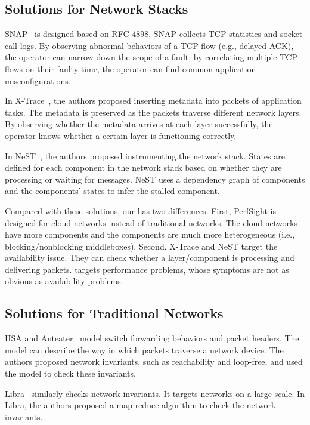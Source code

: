 \subsection{Solutions for Network Stacks}
SNAP~\cite{snap} is designed based on RFC 4898. SNAP collects TCP statistics and socket-call logs.
By observing abnormal behaviors of a TCP flow (e.g., delayed ACK), the operator
can narrow down the scope of a fault; by correlating multiple TCP flows on their faulty time,
the operator can find common application misconfigurations.

In X-Trace~\cite{xtrace}, the authors proposed inserting metadata into packets of application tasks. 
The metadata is 
preserved as the packets traverse different network layers. By observing whether
the metadata arrives at each layer successfully, the operator knows whether
a certain layer is functioning correctly.

In NeST~\cite{nest}, the authors proposed instrumenting the network stack. 
States are defined for each component in the network stack based on whether
they are processing or waiting for messages. NeST uses a dependency graph
of components and the components' states to infer the stalled component.

Compared with these solutions, our \Name has two differences. First, PerfSight
is designed for cloud networks instead of traditional networks.
The cloud networks have more components and the components are much more
heterogeneous (i.e., blocking/nonblocking middleboxes). 
Second, X-Trace and NeST target the availability issue. They can check whether
a layer/component is processing and delivering packets. \Name targets performance
problems, whose symptoms are not as obvious as availability problems.

\subsection{Solutions for Traditional Networks}
HSA and Anteater~\cite{hsa, anteater} model switch forwarding behaviors and packet headers. 
The model can describe the way in which packets traverse a network device. The authors proposed 
network invariants, such as reachability and loop-free, and used the model
to check these invariants.

Libra~\cite{libra} similarly checks network invariants. It targets networks on a large scale.
In Libra, the authors proposed a map-reduce algorithm to check the network invariants.

